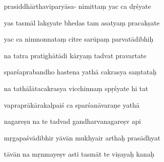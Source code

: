 \documentclass[article,12pt,a4paper]{memoir}%
\newcounter{parCount}
\begin{document}
	  
	  \pstart {} prasiddhārthaviparyāsa- nimittaṃ yac ca dṛśyate 
	{}
	\pend%
      

	  
	  \pstart \leavevmode%
	yas tasmāl lakṣyate bhedas tam asatyaṃ pracakṣate 
	{}
	\pend%
      

	  
	  \pstart {} yac ca nimnonnataṃ citre sarūpaṃ parvatādibhiḥ 
	{}
	\pend%
      

	  
	  \pstart \leavevmode%
	na tatra pratighātādi kāryaṃ tadvat pravartate 
	{}
	\pend%
      

	  
	  \pstart {} sparśaprabandho hastena yathā cakrasya saṃtataḥ 
	{}
	\pend%
      

	  
	  \pstart \leavevmode%
	na tathālātacakrasya vicchinnaṃ spṛśyate hi tat 
	{}
	\pend%
      

	  
	  \pstart {} vapraprākārakalpaiś ca sparśanāvaraṇe yathā 
	{}
	\pend%
      

	  
	  \pstart \leavevmode%
	nagareṣu na te tadvad gandharvanagareṣv api 
	{}
	\pend%
      

	  
	  \pstart {} mṛgapaśvādibhir yāvān mukhyair arthaḥ prasādhyat 
	{}
	\pend%
      

	  
	  \pstart \leavevmode%
	tāvān na mṛnmayeṣv asti tasmāt te viṣayaḥ kanaḥ 
	{}
	\pend%
      
\end{document}
